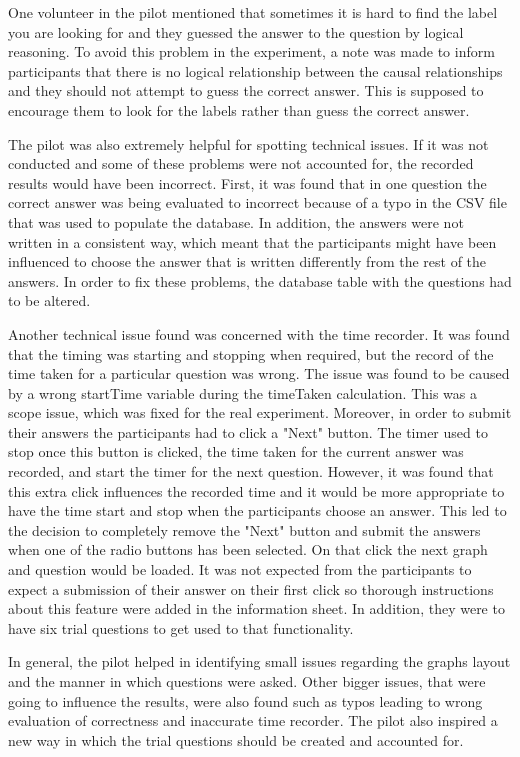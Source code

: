 \documentclass{l4proj}
\begin{document}
One volunteer in the pilot mentioned that sometimes it is hard to find the label you are looking for and they guessed the answer to the question by logical reasoning. To avoid this problem in the experiment, a note was made to inform participants that there is no logical relationship between the causal relationships and they should not attempt to guess the correct answer. This is supposed to encourage them to look for the labels rather than guess the correct answer. 

The pilot was also extremely helpful for spotting technical issues. If it was not conducted and some of these problems were not accounted for, the recorded results would have been incorrect. First, it was found that in one question the correct answer was being evaluated to incorrect because of a typo in the CSV file that was used to populate the database. In addition, the answers were not written in a consistent way, which meant that the participants might have been influenced to choose the answer that is written differently from the rest of the answers. In order to fix these problems, the database table with the questions had to be altered. 

Another technical issue found was concerned with the time recorder. It was found that the timing was starting and stopping when required, but the record of the time taken for a particular question was wrong. The issue was found to be caused by a wrong startTime variable during the timeTaken calculation. This was a scope issue, which was fixed for the real experiment. Moreover, in order to submit their answers the participants had to click a "Next" button. The timer used to stop once this button is clicked, the time taken for the current answer was recorded, and start the timer for the next question. However, it was found that this extra click influences the recorded time and it would be more appropriate to have the time start and stop when the participants choose an answer. This led to the decision to completely remove the "Next" button and submit the answers when one of the radio buttons has been selected. On that click the next graph and question would be loaded. It was not expected from the participants to expect a submission of their answer on their first click so thorough instructions about this feature were added in the information sheet. In addition, they were to have six trial questions to get used to that functionality. 
 
In general, the pilot helped in identifying small issues regarding the graphs layout and the manner in which questions were asked. Other bigger issues, that were going to influence the results, were also found such as typos leading to wrong evaluation of correctness and inaccurate time recorder. The pilot also inspired a new way in which the trial questions should be created and accounted for.
\end{document}
